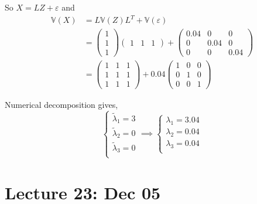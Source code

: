 \documentclass[12pt]{article}
\begin{document}
        So $X = LZ + \varepsilon$ and
        \begin{align*}
            \mathbb{V}(X) &= L\mathbb{V}(Z) L^T + \mathbb{V}(\varepsilon)\\ 
                &= \begin{pmatrix}
                    1\\1\\1
                \end{pmatrix} \begin{pmatrix}
                    1 & 1 & 1
                \end{pmatrix} + \begin{pmatrix}
                    0.04 & 0 & 0\\
                    0 & 0.04 & 0\\
                    0 & 0 & 0.04
                \end{pmatrix}\\ 
                &= \begin{pmatrix}
                    1 & 1 & 1\\ 
                    1 & 1 & 1\\
                    1 & 1 & 1
                \end{pmatrix} + 0.04 \begin{pmatrix}
                    1 & 0 & 0\\
                    0 & 1 & 0\\
                    0 & 0 & 1
                \end{pmatrix}
        \end{align*}

        Numerical decomposition gives, 
        \[\begin{cases}
            \tilde{\lambda}_1 = 3\\ 
            \tilde{\lambda}_2 = 0\\
            \tilde{\lambda}_3 = 0\\
        \end{cases} \implies \begin{cases}
            \lambda_1 = 3.04\\ 
            \lambda_2 = 0.04\\
            \lambda_3 = 0.04\\
        \end{cases}\]

\section{Lecture 23: Dec 05}
\end{document}

